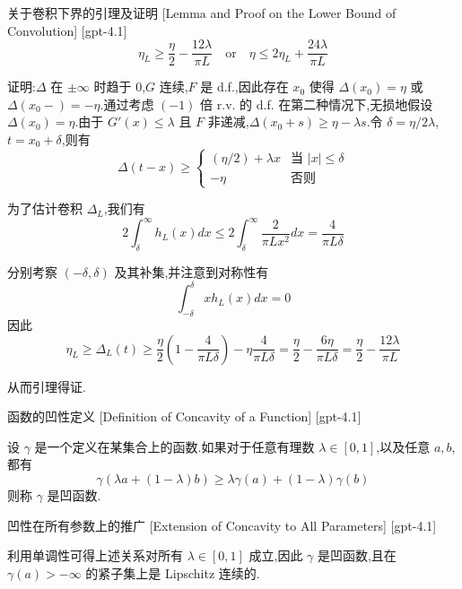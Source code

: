 \documentclass[UTF8]{ctexart}
\begin{document}
    
    
    \begin{lma}
        {关于卷积下界的引理及证明}
        [Lemma and Proof on the Lower Bound of Convolution]
        [gpt-4.1]
        \[
\eta_{L} \geq \frac{\eta}{2} - \frac{12\lambda}{\pi L} \quad \text{or} \quad \eta \leq 2\eta_{L} + \frac{24\lambda}{\pi L}
\]

证明:$\Delta$ 在 $\pm \infty$ 时趋于 0,$G$ 连续,$F$ 是 d.f.,因此存在 $x_{0}$ 使得 $\Delta(x_{0}) = \eta$ 或 $\Delta(x_{0}-) = -\eta$.通过考虑 $(-1)$ 倍 r.v. 的 d.f. 在第二种情况下,无损地假设 $\Delta(x_{0}) = \eta$.由于 $G'(x) \leq \lambda$ 且 $F$ 非递减,$\Delta(x_{0}+s) \geq \eta - \lambda s$.令 $\delta = \eta / 2\lambda$,$t = x_{0} + \delta$,则有
\[
\Delta(t-x) \geq
\begin{cases}
(\eta/2) + \lambda x & \text{当 } |x| \leq \delta \\
-\eta & \text{否则}
\end{cases}
\]

为了估计卷积 $\Delta_{L}$,我们有
\[
2 \int_{\delta}^{\infty} h_{L}(x) dx \leq 2 \int_{\delta}^{\infty} \frac{2}{\pi L x^{2}} dx = \frac{4}{\pi L \delta}
\]

分别考察 $(-\delta, \delta)$ 及其补集,并注意到对称性有
\[
\int_{-\delta}^{\delta} x h_{L}(x) dx = 0
\]
因此
\[
\eta_{L} \geq \Delta_{L}(t) \geq \frac{\eta}{2} \left( 1 - \frac{4}{\pi L \delta} \right) - \eta \frac{4}{\pi L \delta} = \frac{\eta}{2} - \frac{6\eta}{\pi L \delta} = \frac{\eta}{2} - \frac{12\lambda}{\pi L}
\]

从而引理得证.

    \end{lma}
    
    
    
    \begin{dfn}
        {函数的凹性定义}
        [Definition of Concavity of a Function]
        [gpt-4.1]
        
设 $\gamma$ 是一个定义在某集合上的函数.如果对于任意有理数 $\lambda \in [0,1]$,以及任意 $a, b$,都有
\[
\gamma(\lambda a + (1 - \lambda) b) \geq \lambda \gamma(a) + (1 - \lambda) \gamma(b)
\]
则称 $\gamma$ 是凹函数.

    \end{dfn}
    
    
    
    \begin{crl}
        {凹性在所有参数上的推广}
        [Extension of Concavity to All Parameters]
        [gpt-4.1]
        
利用单调性可得上述关系对所有 $\lambda \in [0, 1]$ 成立,因此 $\gamma$ 是凹函数,且在 $\gamma(a) > -\infty$ 的紧子集上是 Lipschitz 连续的.

    \end{crl}
    
\end{document}
